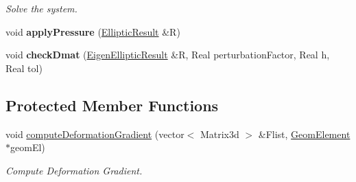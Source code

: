 \begin{DoxyCompactItemize}
\begin{DoxyCompactList}\small\item\em Solve the system. \item\end{DoxyCompactList}\item 
\hypertarget{classvoom_1_1_mechanics_model_a43aef052a6592002c1ab4784b6e65090}{
void {\bfseries applyPressure} (\hyperlink{structvoom_1_1_elliptic_result}{EllipticResult} \&R)}
\label{classvoom_1_1_mechanics_model_a43aef052a6592002c1ab4784b6e65090}

\item 
\hypertarget{classvoom_1_1_mechanics_model_a5523c57bc22db1193a3dd52edd46d1bc}{
void {\bfseries checkDmat} (\hyperlink{structvoom_1_1_eigen_elliptic_result}{EigenEllipticResult} \&R, Real perturbationFactor, Real h, Real tol)}
\label{classvoom_1_1_mechanics_model_a5523c57bc22db1193a3dd52edd46d1bc}

\end{DoxyCompactItemize}
\subsection*{Protected Member Functions}
\begin{DoxyCompactItemize}
\item 
\hypertarget{classvoom_1_1_mechanics_model_aa44a8b08dc23ea0279ed2bf6b78e56f8}{
void \hyperlink{classvoom_1_1_mechanics_model_aa44a8b08dc23ea0279ed2bf6b78e56f8}{computeDeformationGradient} (vector$<$ Matrix3d $>$ \&Flist, \hyperlink{classvoom_1_1_geom_element}{GeomElement} $\ast$geomEl)}
\label{classvoom_1_1_mechanics_model_aa44a8b08dc23ea0279ed2bf6b78e56f8}

\begin{DoxyCompactList}\small\item\em Compute Deformation Gradient. \item\end{DoxyCompactList}\end{DoxyCompactItemize}
